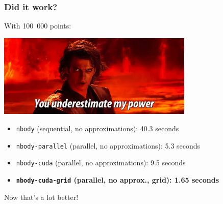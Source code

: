 \begin{frame}
\frametitle{Did it work?}

With 100~000 points:

\begin{center}
	\includegraphics[width=0.7\textwidth]{images/power.png}
\end{center}

\begin{itemize}
	\item \texttt{nbody} (sequential, no approximations): 40.3 seconds
	\item \texttt{nbody-parallel} (parallel, no approximations): 5.3 seconds
	\item \texttt{nbody-cuda} (parallel, no approximations): 9.5 seconds
	\item \textbf{\texttt{nbody-cuda-grid} (parallel, no approx., grid): 1.65 seconds}
\end{itemize}

 Now that's a lot better!

\end{frame}



